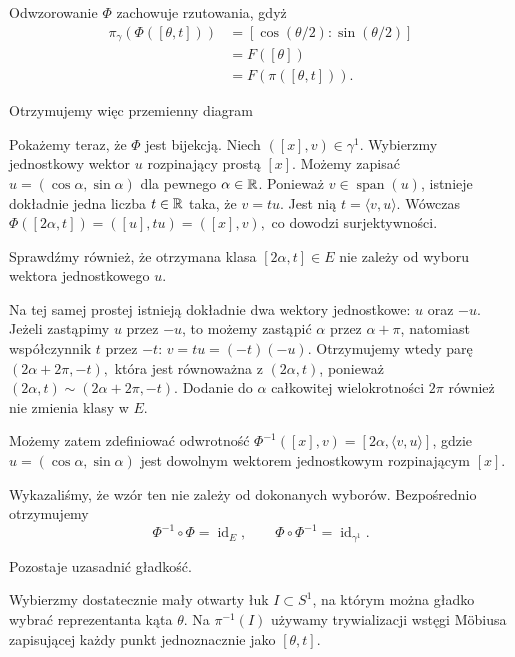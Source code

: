 \begin{przyklad}
Odwzorowanie $\Phi$ zachowuje rzutowania,
gdyż
\[
\begin{aligned}
\pi_\gamma(\Phi([\theta,t]))
&=[\cos(\theta/2):\sin(\theta/2)]\\
&=F([\theta])\\
&=F(\pi([\theta,t])).
\end{aligned}
\]

Otrzymujemy więc przemienny diagram
\begin{center}
\end{center}
Pokażemy teraz, że $\Phi$ jest bijekcją.
Niech
$
([x],v)\in\gamma^1.
$
Wybierzmy jednostkowy wektor $u$
rozpinający prostą $[x]$.
Możemy zapisać
$
u=(\cos\alpha,\sin\alpha)
$
dla pewnego $\alpha\in\mathbb{R}$.
Ponieważ $v\in\operatorname{span}(u)$,
istnieje dokładnie jedna liczba $t\in\mathbb{R}$
taka, że
$
v=tu.
$
Jest nią
$
t=\langle v,u\rangle.
$
Wówczas
$
\Phi([2\alpha,t])
=
([u],tu)
=
([x],v),
$
co dowodzi surjektywności.

Sprawdźmy również, że otrzymana klasa
$[2\alpha,t]\in E$ nie zależy od wyboru
wektora jednostkowego $u$.

Na tej samej prostej istnieją dokładnie
dwa wektory jednostkowe: $u$ oraz $-u$.
Jeżeli zastąpimy $u$ przez $-u$, to możemy
zastąpić $\alpha$ przez $\alpha+\pi$,
natomiast współczynnik $t$ przez $-t$:
$
v=tu=(-t)(-u).
$
Otrzymujemy wtedy parę
$
(2\alpha+2\pi,-t),
$
która jest równoważna z $(2\alpha,t)$,
ponieważ
$
(2\alpha,t)\sim(2\alpha+2\pi,-t).
$
Dodanie do $\alpha$ całkowitej wielokrotności
$2\pi$ również nie zmienia klasy w $E$.

Możemy zatem zdefiniować odwrotność $\Phi^{-1}([x],v) = [2\alpha,\langle v,u\rangle]$,
gdzie $u=(\cos\alpha,\sin\alpha)$
jest dowolnym wektorem jednostkowym
rozpinającym $[x]$.

Wykazaliśmy, że wzór ten nie zależy
od dokonanych wyborów.
Bezpośrednio otrzymujemy
\[
\Phi^{-1}\circ\Phi=\operatorname{id}_E,
\qquad
\Phi\circ\Phi^{-1}=\operatorname{id}_{\gamma^1}.
\]

Pozostaje uzasadnić gładkość.

Wybierzmy dostatecznie mały otwarty łuk
$I\subset S^1$, na którym można gładko
wybrać reprezentanta kąta $\theta$.
Na $\pi^{-1}(I)$ używamy trywializacji
wstęgi Möbiusa zapisującej każdy punkt
jednoznacznie jako $[\theta,t]$.


\end{przyklad}

